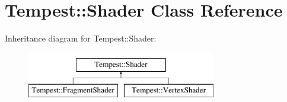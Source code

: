 \hypertarget{class_tempest_1_1_shader}{\section{Tempest\+:\+:Shader Class Reference}
\label{class_tempest_1_1_shader}
}
Inheritance diagram for Tempest\+:\+:Shader\+:\begin{figure}[H]
\begin{center}
\leavevmode
\includegraphics[height=2.000000cm]{class_tempest_1_1_shader}
\end{center}
\end{figure}
